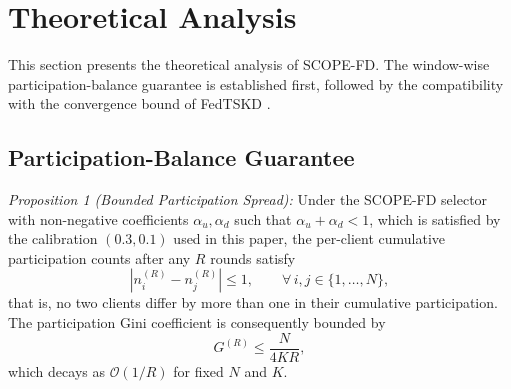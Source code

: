 \documentclass[journal]{IEEEtran}
\begin{document}
\section{Theoretical Analysis}
\label{sec:theory}

This section presents the theoretical analysis of SCOPE-FD. The window-wise participation-balance guarantee is established first, followed by the compatibility with the convergence bound of FedTSKD \cite{mu2024fedtskd}.

\subsection{Participation-Balance Guarantee}
\label{ssec:participation-balance}

\textit{Proposition 1 (Bounded Participation Spread):} Under the SCOPE-FD selector with non-negative coefficients $\alpha_u, \alpha_d$ such that $\alpha_u + \alpha_d < 1$, which is satisfied by the calibration $(0.3, 0.1)$ used in this paper, the per-client cumulative participation counts after any $R$ rounds satisfy
\begin{equation}
\left| n_i^{(R)} - n_j^{(R)} \right| \le 1, \qquad \forall\, i,j \in \{1,\dots,N\},
\label{eq:spread}
\end{equation}
that is, no two clients differ by more than one in their cumulative participation. The participation Gini coefficient is consequently bounded by
\begin{equation}
G^{(R)} \le \frac{N}{4KR},
\label{eq:gini_bound}
\end{equation}
which decays as $\mathcal{O}(1/R)$ for fixed $N$ and $K$.
\end{document}
